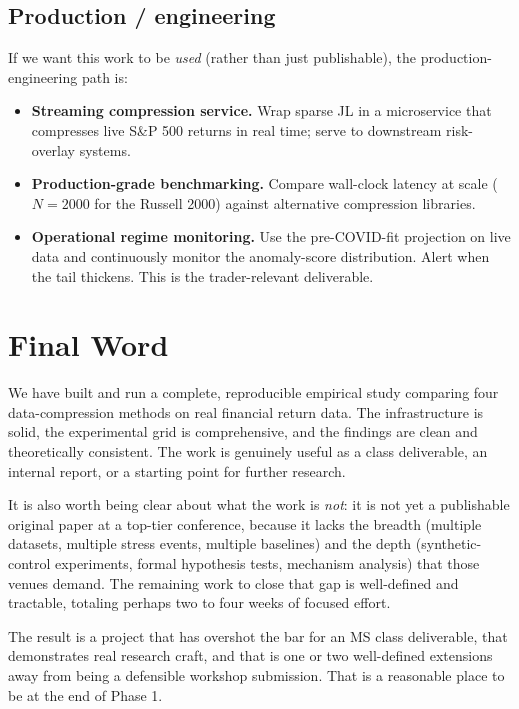 \documentclass[11pt]{article}
\begin{document}
\subsection{Production / engineering}

If we want this work to be \emph{used} (rather than just publishable), the production-engineering path is:

\begin{itemize}
    \item \textbf{Streaming compression service.} Wrap sparse JL in a microservice that compresses live S\&P 500 returns in real time; serve to downstream risk-overlay systems.
    \item \textbf{Production-grade benchmarking.} Compare wall-clock latency at scale ($N=2000$ for the Russell 2000) against alternative compression libraries.
    \item \textbf{Operational regime monitoring.} Use the pre-COVID-fit projection on live data and continuously monitor the anomaly-score distribution. Alert when the tail thickens. This is the trader-relevant deliverable.
\end{itemize}

\section{Final Word}

We have built and run a complete, reproducible empirical study comparing four data-compression methods on real financial return data. The infrastructure is solid, the experimental grid is comprehensive, and the findings are clean and theoretically consistent. The work is genuinely useful as a class deliverable, an internal report, or a starting point for further research.

It is also worth being clear about what the work is \emph{not}: it is not yet a publishable original paper at a top-tier conference, because it lacks the breadth (multiple datasets, multiple stress events, multiple baselines) and the depth (synthetic-control experiments, formal hypothesis tests, mechanism analysis) that those venues demand. The remaining work to close that gap is well-defined and tractable, totaling perhaps two to four weeks of focused effort.

The result is a project that has overshot the bar for an MS class deliverable, that demonstrates real research craft, and that is one or two well-defined extensions away from being a defensible workshop submission. That is a reasonable place to be at the end of Phase 1.
\end{document}
